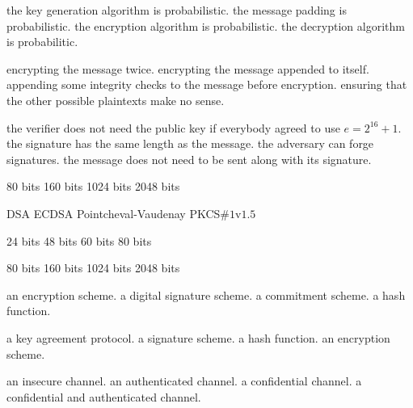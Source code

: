 {the key generation algorithm is probabilistic.}
{the message padding is probabilistic.}
{the encryption algorithm is probabilistic.}
{the decryption algorithm is probabilitic.}

{encrypting the message twice.}
{encrypting the message appended to itself.}
{appending some integrity checks to the message before encryption.}
{ensuring that the other possible plaintexts make no sense.}

{the verifier does not need the public key if everybody agreed to use $e=2^{16}+1$.}
{the signature has the same length as the message.}
{the adversary can forge signatures.}
{the message does not need to be sent along with its signature.}

{80 bits}
{160 bits}
{1024 bits}
{2048 bits}

{DSA}
{ECDSA}
{Pointcheval-Vaudenay}
{PKCS$\#1$v$1.5$}

{24 bits}
{48 bits}
{60 bits}
{80 bits}
	

{80 bits}
{160 bits}
{1024 bits}
{2048 bits}

{an encryption scheme.}
{a digital signature scheme.}
{a commitment scheme.}
{a hash function.}

 {a key agreement protocol.}%
 {a signature scheme.}%
 {a hash function.}%
 {an encryption scheme.}%
 
 {an insecure channel.}%
 {an authenticated channel.}%
 {a confidential channel.}%
 {a confidential and authenticated channel.}%
 
